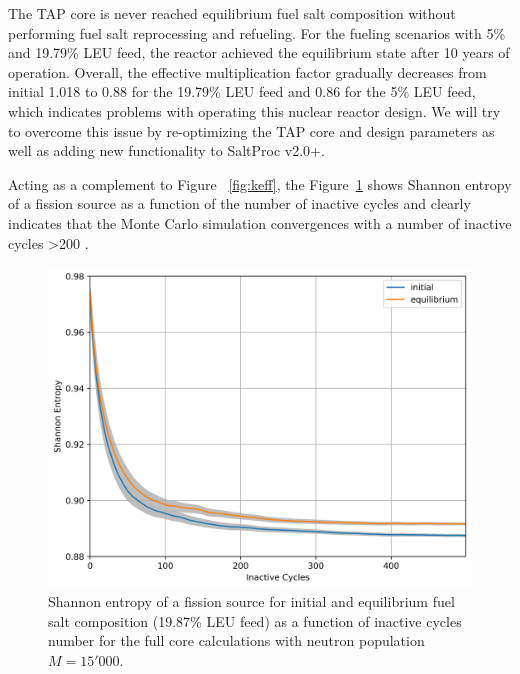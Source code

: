 \documentclass[12pt]{article} %
\begin{document}
The \gls{TAP} core is never reached equilibrium fuel salt composition without 
performing fuel salt reprocessing and refueling. For the fueling scenarios with 
5\% and 19.79\% \gls{LEU} feed, the reactor achieved the equilibrium state after 
10 years of operation. Overall, the effective multiplication 
factor gradually decreases from initial 1.018 to 0.88 for the 19.79\% 
\gls{LEU} feed and 0.86 for the 5\% \gls{LEU} feed, which indicates 
problems with operating this nuclear reactor design. We will try to overcome 
this issue by re-optimizing the \gls{TAP} core and design parameters as well as 
adding new functionality to SaltProc v2.0+.

Acting as a complement to Figure ~\ref{fig:keff}, the Figure~\ref{fig:shannon} 
shows Shannon entropy of a fission source as a function of the number of inactive 
cycles and clearly indicates that the Monte Carlo simulation convergences with a 
number of inactive cycles >200 \cite{brown_k-effective_2011-1}. 
\begin{figure}[htp!] %
  \centering
		  \includegraphics[width=\textwidth]{h_src.png}
	 \vspace{-0.35in}
  \caption{Shannon entropy of a fission source for initial and equilibrium 
  fuel salt composition (19.87\% \gls{LEU} feed) as a function of inactive 
  cycles number for the full core calculations with neutron population $M=15'000$.}
  \label{fig:shannon}
\end{figure}
\end{document}
